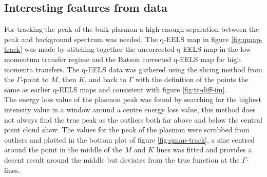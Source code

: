 \subsection{Interesting features from data}
%
For tracking the peak of the bulk plasmon a high enough separation between the peak and background spectrum was needed. The q-EELS map in figure \ref{fig:qmap-track} was made by stitching together the uncorrected q-EELS map in the low momentum transfer regime and the Batson corrected q-EELS map for high momenta transfers. The q-EELS data was gathered using the slicing method from the $\Gamma$-point to $M$, then $K$, and back to $\Gamma$ with the definition of the points the same as earlier q-EELS maps and consistent with figure \ref{fig:tr-diff-im}.\\
The energy loss value of the plasmon peak was found by searching for the highest intensity value in a window around a centre energy loss value, this method does not always find the true peak as the outliers both far above and below the central point cloud show. The values for the peak of the plasmon were scrubbed from outliers and plotted in the bottom plot of figure \ref{fig:qmap-track}, a sine centred around the point in the middle of the $M$ and $K$ lines was fitted and provides a decent result around the middle but deviates from the true function at the $\Gamma$-lines.\\
%
